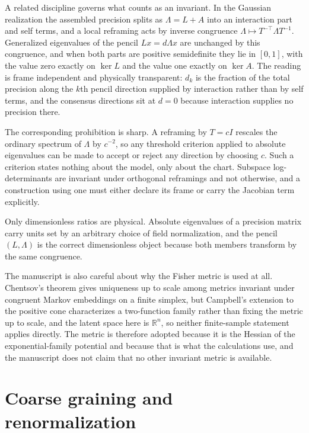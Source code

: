 \documentclass[11pt,letterpaper]{article}
\begin{document}
A related discipline governs what counts as an invariant. In the Gaussian realization the assembled precision splits as \(\Lambda=L+A\) into an interaction part and self terms, and a local reframing acts by inverse congruence \(\Lambda\mapsto T^{-\top}\Lambda T^{-1}\). Generalized eigenvalues of the pencil \(Lx=d\Lambda x\) are unchanged by this congruence, and when both parts are positive semidefinite they lie in \([0,1]\), with the value zero exactly on \(\ker L\) and the value one exactly on \(\ker A\). The reading is frame independent and physically transparent: \(d_k\) is the fraction of the total precision along the \(k\)th pencil direction supplied by interaction rather than by self terms, and the consensus directions sit at \(d=0\) because interaction supplies no precision there.

The corresponding prohibition is sharp. A reframing by \(T=cI\) rescales the ordinary spectrum of \(\Lambda\) by \(c^{-2}\), so any threshold criterion applied to absolute eigenvalues can be made to accept or reject any direction by choosing \(c\). Such a criterion states nothing about the model, only about the chart. Subspace log-determinants are invariant under orthogonal reframings and not otherwise, and a construction using one must either declare its frame or carry the Jacobian term explicitly.

\begin{physicalreading}
Only dimensionless ratios are physical. Absolute eigenvalues of a precision matrix carry units set by an arbitrary choice of field normalization, and the pencil \((L,\Lambda)\) is the correct dimensionless object because both members transform by the same congruence.
\end{physicalreading}

The manuscript is also careful about why the Fisher metric is used at all. Chentsov's theorem gives uniqueness up to scale among metrics invariant under congruent Markov embeddings on a finite simplex, but Campbell's extension to the positive cone characterizes a two-function family rather than fixing the metric up to scale, and the latent space here is \(\mathbb R^n\), so neither finite-sample statement applies directly. The metric is therefore adopted because it is the Hessian of the exponential-family potential and because that is what the calculations use, and the manuscript does not claim that no other invariant metric is available.

\section{Coarse graining and renormalization}
\end{document}
